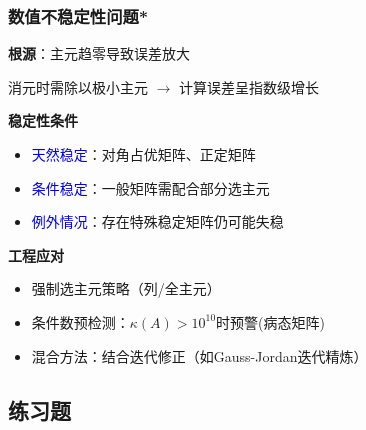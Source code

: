 \begin{frame}[t]\frametitle{数值不稳定性问题*}
\textbf{根源}：主元趋零导致误差放大

\pp
\bigskip

消元时需除以极小主元 $\rightarrow$ 计算误差呈指数级增长

\pp
\bigskip

\textbf{稳定性条件}
\begin{itemize}
\item \textcolor{blue}{天然稳定}：对角占优矩阵、正定矩阵
\pp
\item \textcolor{blue}{条件稳定}：一般矩阵需配合部分选主元
\pp
\item \textcolor{blue}{例外情况}：存在特殊稳定矩阵仍可能失稳
\end{itemize}

\pp
\bigskip

\textbf{工程应对}
\begin{itemize}
\item 强制选主元策略（列/全主元）
\item 条件数预检测：$\kappa(A)> 10^{10}$时预警(病态矩阵)
\item 混合方法：结合迭代修正（如Gauss-Jordan迭代精炼）
\end{itemize}

\begin{center} \Large
{}
\end{center}
\end{frame}



\subsection{练习题}


